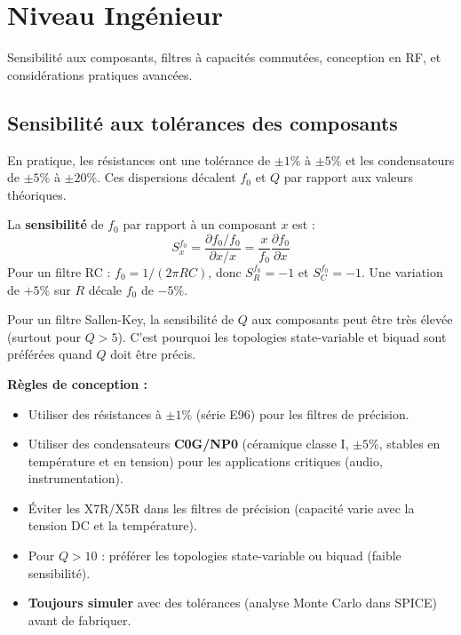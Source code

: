 \documentclass[12pt,a4paper,twoside]{book}
\begin{document}
\section{Niveau Ingénieur}

\begin{ingenieur}
Sensibilité aux composants, filtres à capacités commutées, conception en RF, et considérations pratiques avancées.
\end{ingenieur}

\subsection{Sensibilité aux tolérances des composants}

En pratique, les résistances ont une tolérance de $\pm1\%$ à $\pm5\%$ et les condensateurs de $\pm5\%$ à $\pm20\%$. Ces dispersions décalent $f_0$ et $Q$ par rapport aux valeurs théoriques.

\begin{formule}
La \textbf{sensibilité} de $f_0$ par rapport à un composant $x$ est :
\[
S_x^{f_0} = \frac{\partial f_0 / f_0}{\partial x / x} = \frac{x}{f_0}\frac{\partial f_0}{\partial x}
\]
Pour un filtre RC : $f_0 = 1/(2\pi RC)$, donc $S_R^{f_0} = -1$ et $S_C^{f_0} = -1$. Une variation de $+5\%$ sur $R$ décale $f_0$ de $-5\%$.

Pour un filtre Sallen-Key, la sensibilité de $Q$ aux composants peut être très élevée (surtout pour $Q > 5$). C'est pourquoi les topologies state-variable et biquad sont préférées quand $Q$ doit être précis.
\end{formule}

\begin{pratique}
\textbf{Règles de conception :}
\begin{itemize}[nosep]
\item Utiliser des résistances à $\pm1\%$ (série E96) pour les filtres de précision.
\item Utiliser des condensateurs \textbf{C0G/NP0} (céramique classe I, $\pm5\%$, stables en température et en tension) pour les applications critiques (audio, instrumentation).
\item Éviter les X7R/X5R dans les filtres de précision (capacité varie avec la tension DC et la température).
\item Pour $Q > 10$ : préférer les topologies state-variable ou biquad (faible sensibilité).
\item \textbf{Toujours simuler} avec des tolérances (analyse Monte Carlo dans SPICE) avant de fabriquer.
\end{itemize}
\end{pratique}
\end{document}
